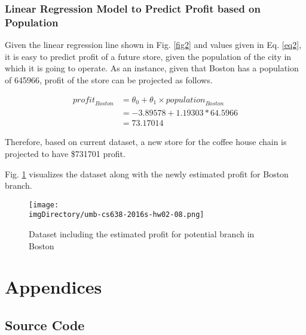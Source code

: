 \documentclass[12pt,letterpaper,twoside]{article}
\begin{document}
\subsubsection*{Linear Regression Model to Predict Profit based on Population}

Given the linear regression line shown in Fig. \ref{fig2} and values given in Eq. \ref{eq2}, it is easy to predict profit of a future store, given the population of the city in which it is going to operate.
As an instance, given that Boston has a population of 645966, profit of the store can be projected as follows.

\begin{equation}\label{eq5}
\begin{split}
\mathit{profit}_\mathit{Boston} & = \theta_0 + \theta_1 \times \mathit{population}_\mathit{Boston} \\
 & = -3.89578 + 1.19303 * 64.5966 \\
 & = 73.17014
\end{split}
\end{equation}

Therefore, based on current dataset, a new store for the coffee house chain is projected to have \$731701 profit.

Fig. \ref{fig6} visualizes the dataset along with the newly estimated profit for Boston branch.

\begin{figure}[H]\centering
\texttt{[image: \\imgDirectory/umb-cs638-2016s-hw02-08.png]}
\caption{Dataset including the estimated profit for potential branch in Boston}\label{fig6}
\end{figure}

\cleardoublepage

\section*{Appendices}

\subsection*{Source Code}

\lstset{language=r,tabsize=4}

\end{document}
